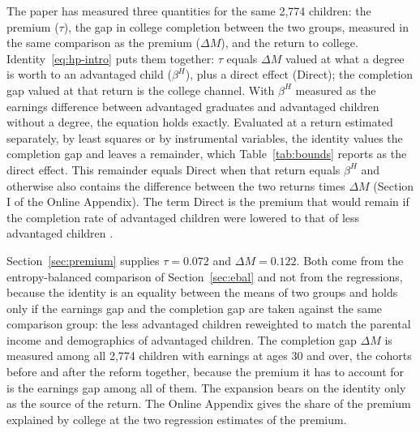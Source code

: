 \documentclass[11pt]{article}
\begin{document}
The paper has measured three quantities for the same 2,774 children: the premium ($\tau$), the gap in college completion between the two groups, measured in the same comparison as the premium ($\Delta M$), and the return to college. Identity~\eqref{eq:hp-intro} puts them together: $\tau$ equals $\Delta M$ valued at what a degree is worth to an advantaged child ($\beta^{H}$), plus a direct effect (Direct); the completion gap valued at that return is the college channel. With $\beta^{H}$ measured as the earnings difference between advantaged graduates and advantaged children without a degree, the equation holds exactly. Evaluated at a return estimated separately, by least squares or by instrumental variables, the identity values the completion gap and leaves a remainder, which Table~\ref{tab:bounds} reports as the direct effect. This remainder equals Direct when that return equals $\beta^{H}$ and otherwise also contains the difference between the two returns times $\Delta M$ (Section I of the Online Appendix). The term Direct is the premium that would remain if the completion rate of advantaged children were lowered to that of less advantaged children \citep{HeckmanPinto2015}. 

Section~\ref{sec:premium} supplies $\tau = 0.072$ and $\Delta M = 0.122$. Both come from the entropy-balanced
comparison of Section~\ref{sec:ebal} and not from the regressions,
because the identity is an equality between the means of two groups and
holds only if the earnings gap and the completion gap are taken against the same comparison group: the less advantaged children reweighted to match the parental income and demographics of advantaged children. The completion gap $\Delta M$ is measured among all 2,774 children with earnings at ages 30 and over, the cohorts before and after the reform together, because the
premium it has to account for is the earnings gap among all of them.
The expansion bears on the identity only as the source of the return. The Online Appendix gives the share of the premium explained by college at the two regression estimates of the premium.
\end{document}
